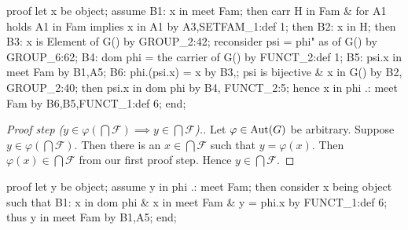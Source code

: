 \nwenddocs{}\endmoddef\nwstartdeflinemarkup{}\nwenddeflinemarkup
proof
  let x be object;
  assume B1: x in meet Fam;
  then carr H in Fam & for A1 holds A1 in Fam implies x in A1
  by A3,SETFAM_1:def 1;
  then B2: x in H;
  then B3: x is Element of G() by GROUP_2:42;
  reconsider psi = phi" as  of G() by GROUP_6:62;
  B4: dom phi = the carrier of G() by FUNCT_2:def 1;
  B5: psi.x in meet Fam by B1,A5;
  B6: phi.(psi.x) = x by B3,;
  psi is bijective & x in G() by B2, GROUP_2:40;
  then psi.x in dom phi by B4, FUNCT_2:5;
  hence x in phi .: meet Fam by B6,B5,FUNCT_1:def 6;
end;
\nwendcode{}\nwdocspar

\begin{proof}[Proof step ($y\in\varphi(\bigcap\mathcal{F})\implies y\in\bigcap\mathcal{F}$).]
  Let $\varphi\in\operatorname{Aut}(G)$ be arbitrary.
Suppose $y\in\varphi(\bigcap\mathcal{F})$. Then there is an
$x\in\bigcap\mathcal{F}$ such that $y=\varphi(x)$. Then
$\varphi(x)\in\bigcap\mathcal{F}$ from our first proof step. Hence
$y\in\bigcap\mathcal{F}$.
\end{proof}

\nwenddocs{}\endmoddef\nwstartdeflinemarkup{}\nwenddeflinemarkup
proof
  let y be object;
  assume y in phi .: meet Fam;
  then consider x being object such that
  B1: x in dom phi & x in meet Fam & y = phi.x
  by FUNCT_1:def 6;
  thus y in meet Fam by B1,A5;
end;
\nwendcode{}\nwdocspar

